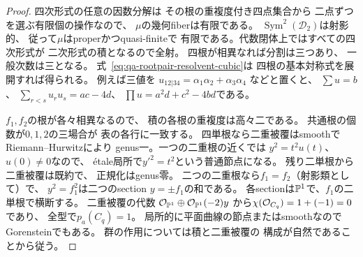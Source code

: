 \begin{proof}
四次形式の任意の因数分解は
その根の重複度付き四点集合から
二点ずつを選ぶ有限個の操作なので、
$\mu$の幾何fiberは有限である。
$\operatorname{Sym}^2(\mathcal D_2)$は射影的、
従って$\mu$はproperかつquasi-finiteで
有限である。代数閉体上ではすべての四次形式が
二次形式の積となるので全射。
四根が相異なれば分割は三つあり、
一般次数は三となる。
式~\eqref{eq:qa-rootpair-resolvent-cubic}は
四根の基本対称式を展開すれば得られる。
例えば三値を
$u_{12|34}=\alpha_1\alpha_2+\alpha_3\alpha_4$
などと置くと、
$\sum u=b$、
$\sum_{r<s}u_ru_s=ac-4d$、
$\prod u=a^2d+c^2-4bd$である。

$f_1,f_2$の根が各々相異なるので、
積の各根の重複度は高々二である。
共通根の個数が$0,1,2$の三場合が
表の各行に一致する。
四単根なら二重被覆はsmoothでRiemann--Hurwitzにより
genus一。一つの二重根の近くでは
$y^2=t^2u(t)$、$u(0)\ne0$なので、
étale局所で$y'^2=t^2$という普通節点になる。
残り二単根から二重被覆は既約で、
正規化はgenus零。
二つの二重根なら$f_1=f_2$（射影類として）で、
$y^2=f_1^2$は二つのsection
$y=\pm f_1$の和である。
各sectionは$\mathbb P^1$で、$f_1$の二単根で横断する。
二重被覆の代数
$\mathcal O_{\mathbb P^1}\oplus\mathcal O_{\mathbb P^1}(-2)y$
から$\chi(\mathcal O_{C_q})=1+(-1)=0$であり、
全型で$p_a(C_q)=1$。
局所的に平面曲線の節点またはsmoothなので
Gorensteinでもある。
群の作用については積と二重被覆の
構成が自然であることから従う。
\end{proof}


